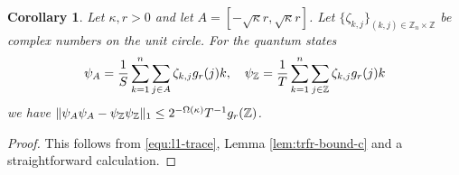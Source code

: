 \documentclass[11pt]{article}
\theoremstyle{plain}
\newtheorem{corollary}[theorem]{Corollary}
\theoremstyle{definition}
\let\ket\relax
\DeclarePairedDelimiter{\ket}{\lvert}{\rangle}
\let\bra\relax
\DeclarePairedDelimiter{\bra}{\langle}{\rvert}
\DeclarePairedDelimiter{\opnorm}{\lVert}{\rVert}
\def\Z{\mathbb{Z}}
\begin{document}
\begin{corollary}
    \label{cor:gaus-apprx}
    Let $\kappa, r > 0$ and let $A = [-\sqrt{\kappa}r, \sqrt{\kappa}r]$. Let $\{ \zeta_{k, j} \}_{(k, j) \in \Z_n \times \Z}$ be complex numbers on the unit circle. For the quantum states  
    \[ \ket{\psi_A} = \frac{1}{S} \sum_{k = 1}^n \sum_{j \in A} \zeta_{k, j} g_r(j) \ket{k}, \quad \ket{\psi_\Z} = \frac{1}{T}\sum_{k = 1}^n \sum_{j \in \Z} \zeta_{k, j} g_r(j) \ket{k} \]
    we have $\opnorm{\ket{\psi_A}\bra{\psi_A} - \ket{\psi_\Z}\bra{\psi_\Z}}_1 \le 2^{-\Omega(\kappa)} T^{-1} g_r(\Z)$.
\end{corollary}
\begin{proof}
    This follows from \eqref{equ:l1-trace}, Lemma \ref{lem:trfr-bound-c} and a straightforward calculation.
\end{proof}
\end{document}
